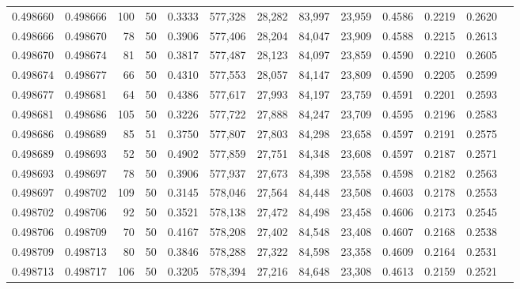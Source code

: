 \begin{tabular}{rrrrrrrrrrrrr}
0.498660 & 0.498666 &   100 &  50 &                                     0.3333 & 577,328 &  28,282 &  83,997 &  23,959 & 0.4586 & 0.2219 & 0.2620 \\
0.498666 & 0.498670 &    78 &  50 &                                     0.3906 & 577,406 &  28,204 &  84,047 &  23,909 & 0.4588 & 0.2215 & 0.2613 \\
0.498670 & 0.498674 &    81 &  50 &                                     0.3817 & 577,487 &  28,123 &  84,097 &  23,859 & 0.4590 & 0.2210 & 0.2605 \\
0.498674 & 0.498677 &    66 &  50 &                                     0.4310 & 577,553 &  28,057 &  84,147 &  23,809 & 0.4590 & 0.2205 & 0.2599 \\
0.498677 & 0.498681 &    64 &  50 &                                     0.4386 & 577,617 &  27,993 &  84,197 &  23,759 & 0.4591 & 0.2201 & 0.2593 \\
0.498681 & 0.498686 &   105 &  50 &                                     0.3226 & 577,722 &  27,888 &  84,247 &  23,709 & 0.4595 & 0.2196 & 0.2583 \\
0.498686 & 0.498689 &    85 &  51 &                                     0.3750 & 577,807 &  27,803 &  84,298 &  23,658 & 0.4597 & 0.2191 & 0.2575 \\
0.498689 & 0.498693 &    52 &  50 &                                     0.4902 & 577,859 &  27,751 &  84,348 &  23,608 & 0.4597 & 0.2187 & 0.2571 \\
0.498693 & 0.498697 &    78 &  50 &                                     0.3906 & 577,937 &  27,673 &  84,398 &  23,558 & 0.4598 & 0.2182 & 0.2563 \\
0.498697 & 0.498702 &   109 &  50 &                                     0.3145 & 578,046 &  27,564 &  84,448 &  23,508 & 0.4603 & 0.2178 & 0.2553 \\
0.498702 & 0.498706 &    92 &  50 &                                     0.3521 & 578,138 &  27,472 &  84,498 &  23,458 & 0.4606 & 0.2173 & 0.2545 \\
0.498706 & 0.498709 &    70 &  50 &                                     0.4167 & 578,208 &  27,402 &  84,548 &  23,408 & 0.4607 & 0.2168 & 0.2538 \\
0.498709 & 0.498713 &    80 &  50 &                                     0.3846 & 578,288 &  27,322 &  84,598 &  23,358 & 0.4609 & 0.2164 & 0.2531 \\
0.498713 & 0.498717 &   106 &  50 &                                     0.3205 & 578,394 &  27,216 &  84,648 &  23,308 & 0.4613 & 0.2159 & 0.2521 \\

\end{tabular}
